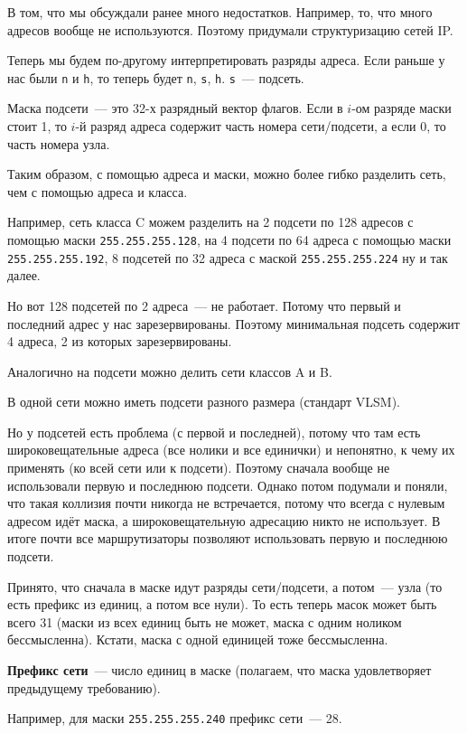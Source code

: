 
В том, что мы обсуждали ранее много недостатков. Например, то, что много адресов вообще не используются. Поэтому придумали структуризацию сетей IP.

Теперь мы будем по-другому интерпретировать разряды адреса. Если раньше у нас были {\tt n} и {\tt h}, то теперь будет {\tt n}, {\tt s}, {\tt h}. {\tt s}~--- подсеть.

Маска подсети~--- это 32-х разрядный вектор флагов. Если в $i$-ом разряде маски стоит 1, то $i$-й разряд адреса содержит часть номера сети/подсети, а если 0, то часть номера узла.

Таким образом, с помощью адреса и маски, можно более гибко разделить сеть, чем с помощью адреса и класса.

Например, сеть класса C можем разделить на 2 подсети по 128 адресов с помощью маски {\tt 255.255.255.128}, на 4 подсети по 64 адреса с помощью маски {\tt 255.255.255.192}, 8 подсетей по 32 адреса с маской {\tt 255.255.255.224} ну и так далее.

Но вот 128 подсетей по 2 адреса~--- не работает. Потому что первый и последний адрес у нас зарезервированы. Поэтому минимальная подсеть содержит 4 адреса, 2 из которых зарезервированы.

Аналогично на подсети можно делить сети классов A и B.

В одной сети можно иметь подсети разного размера (стандарт VLSM).

Но у подсетей есть проблема (с первой и последней), потому что там есть широковещательные адреса (все нолики и все единички) и непонятно, к чему их применять (ко всей сети или к подсети). Поэтому сначала вообще не использовали первую и последнюю подсети. Однако потом подумали и поняли, что такая коллизия почти никогда не встречается, потому что всегда с нулевым адресом идёт маска, а широковещательную адресацию никто не использует. В итоге почти все маршрутизаторы позволяют использовать первую и последнюю подсети.

Принято, что сначала в маске идут разряды сети/подсети, а потом~--- узла (то есть префикс из единиц, а потом все нули). То есть теперь масок может быть всего 31 (маски из всех единиц быть не может, маска с одним ноликом бессмысленна). Кстати, маска с одной единицей тоже бессмысленна.

{\bf Префикс сети}~--- число единиц в маске (полагаем, что маска удовлетворяет предыдущему требованию).

Например, для маски {\tt 255.255.255.240} префикс сети~--- 28.

